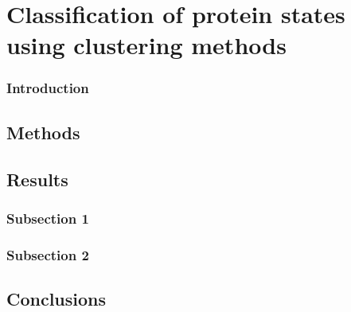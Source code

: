 \chapter{Classification of protein states using clustering methods} \label{ch:C}
\lipsum[1-4]
\subsection{Introduction}
\lipsum[1-4]
\section{Methods}
\lipsum[1-4]
\section{Results}
\lipsum[1-4]
\subsection{Subsection 1}
\lipsum[1]
\subsection{Subsection 2}
\lipsum[1]
\section{Conclusions}
\lipsum[1-4]
